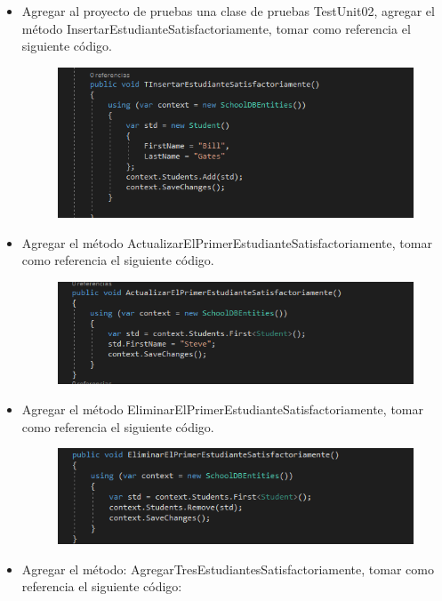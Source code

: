 \begin{itemize}
	\item Agregar al proyecto de pruebas una clase de pruebas TestUnit02, agregar el método
InsertarEstudianteSatisfactoriamente, tomar como referencia el siguiente código.
	\begin{figure}[htb]
\begin{center}
\includegraphics[width=12cm]{./Imagenes/1-6}
\end{center}
\end{figure}
	\item Agregar el método ActualizarElPrimerEstudianteSatisfactoriamente, tomar como referencia el siguiente
código.
\begin{figure}[htb]
\begin{center}
\includegraphics[width=12cm]{./Imagenes/1-7}
\end{center}
\end{figure}
	\item Agregar el método EliminarElPrimerEstudianteSatisfactoriamente, tomar como referencia el siguiente código.
\begin{figure}[htb]
\begin{center}
\includegraphics[width=12cm]{./Imagenes/1-8}
\end{center}
\end{figure}
	\item Agregar el método: AgregarTresEstudiantesSatisfactoriamente, tomar como referencia el siguiente código:


\end{itemize}
